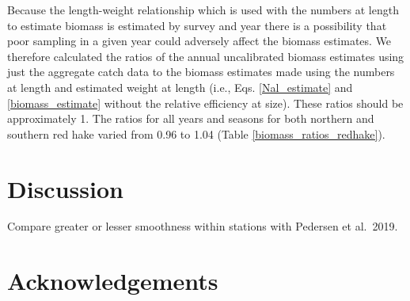 \documentclass[]{article}
\begin{document}
Because the length-weight relationship which is used with the numbers at
length to estimate biomass is estimated by survey and year there is a
possibility that poor sampling in a given year could adversely affect
the biomass estimates. We therefore calculated the ratios of the annual
uncalibrated biomass estimates using just the aggregate catch data to
the biomass estimates made using the numbers at length and estimated
weight at length (i.e., Eqs. \ref{Nal_estimate} and
\ref{biomass_estimate} without the relative efficiency at size). These
ratios should be approximately 1. The ratios for all years and seasons
for both northern and southern red hake varied from 0.96 to 1.04 (Table
\ref{biomass_ratios_redhake}).

\hypertarget{discussion}{%
\section{Discussion}\label{discussion}}

Compare greater or lesser smoothness within stations with Pedersen et
al.~2019.

\hypertarget{acknowledgements}{%
\section*{Acknowledgements}\label{acknowledgements}}

\pagebreak



\hypertarget{refs}{}

\pagebreak
\end{document}
